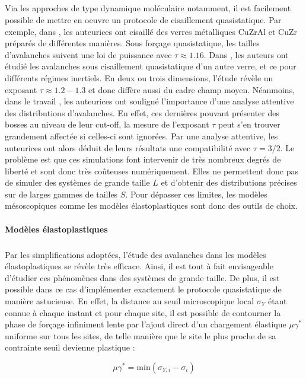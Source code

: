 \subparagraph{}Via les approches de type dynamique moléculaire notamment, il est facilement possible de mettre en oeuvre un protocole de cisaillement quasistatique. Par exemple, dans \cite{makinen_avalanches_2025}, les auteurices ont cisaillé des verres métalliques CuZrAl et CuZr préparés de différentes manières. Sous forçage quasistatique, les tailles d'avalanches suivent une loi de puissance avec $\tau \approx 1.16$. Dans \cite{salerno_effect_2013}, les auteurs ont étudié les avalanches sous cisaillement quasistatique d'un autre verre, et ce pour différents régimes inertiels. En deux ou trois dimensions, l'étude révèle un exposant $\tau \approx 1.2-1.3$ et donc diffère aussi du cadre champ moyen. Néanmoins, dans le travail \cite{oyama_unified_2021}, les auteurices ont souligné l'importance d'une analyse attentive des distributions d'avalanches. En effet, ces dernières pouvant présenter des bosses au niveau de leur cut-off, la mesure de l'exposant $\tau$ peut s'en trouver grandement affectée si celles-ci sont ignorées. Par une analyse attentive, les auteurices ont alors déduit de leurs résultats une compatibilité avec $\tau=3/2$. Le problème est que ces simulations font intervenir de très nombreux degrés de liberté et sont donc très coûteuses numériquement. Elles ne permettent donc pas de simuler des systèmes de grande taille $L$ et d'obtenir des distributions précises sur de larges gammes de tailles $S$. Pour dépasser ces limites, les modèles mésoscopiques comme les modèles élastoplastiques sont donc des outils de choix.

\paragraph{Modèles élastoplastiques}

\subparagraph{}Par les simplifications adoptées, l'étude des avalanches dans les modèles élastoplastiques se révèle très efficace. Ainsi, il est tout à fait envisageable d'étudier ces phénomènes dans des systèmes de grande taille. De plus, il est possible dans ce cas d'implémenter exactement le protocole quasistatique de manière astucieuse. En effet, la distance au seuil microscopique local $\sigma_Y$ étant connue à chaque instant et pour chaque site, il est possible de contourner la phase de forçage infiniment lente par l'ajout direct d'un chargement élastique $\mu\gamma^*$ uniforme sur tous les sites, de telle manière que le site le plus proche de sa contrainte seuil devienne plastique :

\begin{equation}
	\mu\gamma^* = \mathrm{min}(\sigma_{Y,i}-\sigma_i)
\end{equation}

